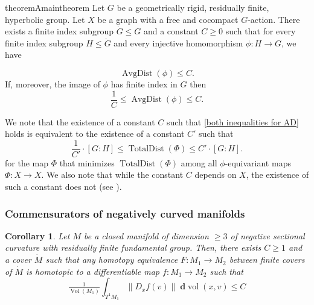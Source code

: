 \documentclass{amsart}
\numberwithin{equation}{section}
\newtheorem{corollary}[theorem]{Corollary}
\newtheorem{theoremA}{Theorem}
\theoremstyle{definition}
\newcommand{\bfd}{\mathbf{d}}
\newcommand{\nir}[1]{\todo[inline, color=magenta]{#1}}
\DeclareMathOperator{\AD}{AvgDist}
\DeclareMathOperator{\TD}{TotalDist}
\DeclareMathOperator{\vol}{vol}
\DeclareMathOperator{\Vol}{Vol}
\begin{document}
\begin{restatable}{theoremA}{maintheorem}\label{main theorem}
    Let $G$ be a geometrically rigid, residually finite, hyperbolic group. 
    Let $X$ be a graph with a free and cocompact $G$-action.
    There exists a finite index subgroup $\dot G\le G$ and a constant $C\ge 0$ such that for every finite index subgroup $H\le \dot G$ and every
    injective homomorphism $\phi:H\to G$, we have 
    
    \begin{equation}\label{the right inequality}\AD(\phi)\le C.
    \end{equation}
    If, moreover, the image of $\phi$ has finite index in $G$ then 
    \begin{equation}\label{both inequalities for AD}
    \frac1C\le \AD(\phi)\le C.
    \end{equation}
    \end{restatable}


    We note that the existence of a constant $C$ such that \eqref{both inequalities for AD} holds is equivalent to the existence of a constant $C'$ such that 
    \begin{equation}\label{main theorem inequality}
    \frac{1}{C'}\cdot [G:H]\le \TD(\Phi)\le {C'}\cdot [G:H].
    \end{equation}
    for the map $\Phi$ that minimizes $\TD(\Phi)$ among all $\phi$-equivariant maps $\Phi:X\to X$.
    We also note that while the constant $C$ depends on $X$, the existence of such a constant does not (see ).
    



\subsubsection*{Commensurators of negatively curved manifolds}

\begin{corollary}\label{main theorem manifolds}
Let $M$ be a closed manifold of dimension $\ge 3$ of negative sectional curvature with residually finite fundamental group. Then, there exists $C\ge 1$ and a cover $\dot M$ such that any homotopy equivalence $F:M_1\to M_2$ between finite covers of $\dot M$ is homotopic to a differentiable map $f:M_1\to M_2$ such that
\begin{equation}\label{manifold inequality}
    \tfrac 1 {\Vol(M_1)}\int_{T^1M_1}\|D_x f(v)\|\; \bfd \vol(x,v) \le C
\end{equation}
\end{corollary}
\end{document}
